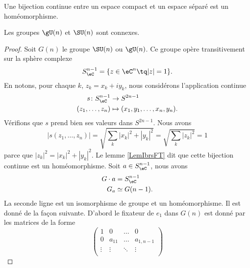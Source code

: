 \begin{lemma}       \label{LemIbrsFT}
	Une bijection continue entre un espace compact et un espace séparé est un homéomorphisme.
\end{lemma}

\begin{proposition}     \label{PROPooTVHJooBRmUCd}
	Les groupes \( \gU(n)\) et \( \SU(n)\) sont connexes.
\end{proposition}

\begin{proof}
	Soit \( G(n)\) le groupe \( \SU(n)\) ou \( \gU(n)\). Ce groupe opère transitivement sur la sphère complexe
	\begin{equation}
		S_{\eC}^{n-1}=\{ z\in \eC^n\tq | z |=1 \}.
	\end{equation}
	En notons, pour chaque \( k\), \( z_k=x_k+iy_k\), nous considérons l'application continue
	\begin{equation}
		\begin{aligned}
			s\colon S_{\eC}^{n-1} & \to S^{2n-1}                       \\
			(z_1,\ldots, z_n)     & \mapsto (x_1,y_1,\ldots, x_n,y_n).
		\end{aligned}
	\end{equation}
	Vérifions que \( s\) prend bien ses valeurs dans \( S^{2n-1}\). Nous avons
	\begin{equation}
		| s(z_1,\ldots, z_n) |=\sqrt{ \sum_k| x_k |^2+| y_k |^2 }=\sqrt{ \sum_k| z_k |^2 }=1
	\end{equation}
	parce que \( | z_k |^2=| x_k |^2+| y_k |^2\). Le lemme \ref{LemIbrsFT} dit que cette bijection continue est un homéomorphisme. Soit \( a\in S^{n-1}_{\eC}\), nous avons
	\begin{subequations}
		\begin{align}
			G\cdot a & =S^{n-1}_{\eC} \\
			G_a      & \simeq G(n-1).
		\end{align}
	\end{subequations}
	La seconde ligne est un isomorphisme de groupe et un homéomorphisme. Il est donné de la façon suivante. D'abord le fixateur de \( e_1\) dans \( G(n)\) est donné par les matrices de la forme
	\begin{equation}
		\begin{pmatrix}
			1      & 0         & \ldots & 0           \\
			0      & a_{11}    & \ldots & a_{1,n-1}   \\
			\vdots & \vdots    & \ddots & \vdots      \\

\end{pmatrix}
\end{equation}
\end{proof}
